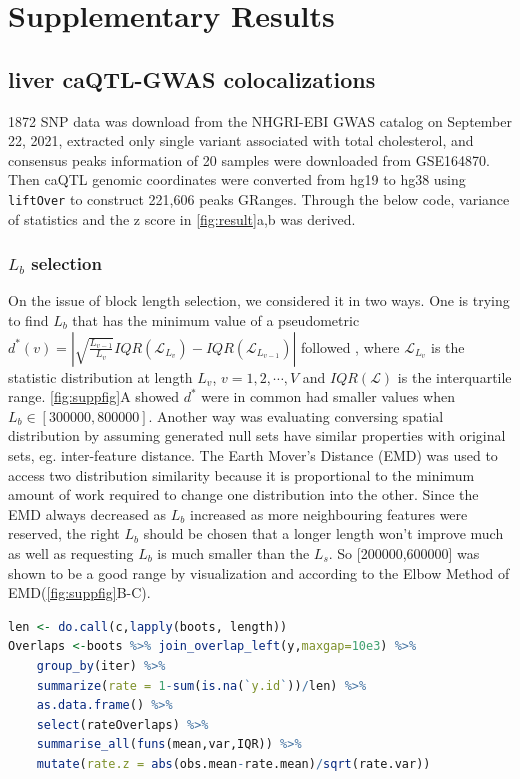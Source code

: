 \documentclass{article}
\newcommand{\code}[1]{\texttt{#1}}
\begin{document}

\section{Supplementary Results} \label{sec:results}
\subsection{liver caQTL-GWAS colocalizations}
1872 SNP data was download from the NHGRI-EBI GWAS catalog \citep{gwascatalog} on September 22, 2021, extracted only single variant  associated with total cholesterol, and consensus peaks information of 20 samples were downloaded from GSE164870.
Then caQTL genomic coordinates were converted from hg19 to hg38 using \code{liftOver} to construct 221,606 peaks GRanges. Through the below code, variance of statistics and the z score in \cref{fig:result}a,b was derived.

\subsubsection{$L_b$ selection}
On the issue of 
block length selection, we considered it in two ways. One is trying to find $L_b$ that has the minimum value of a pseudometric $d^*(v)=|\sqrt{\frac{L_{v-1}}{L_v}}IQR(\mathcal{L}_{L_v})-IQR(\mathcal{L}_{L_{v-1}})|$ followed \citet{bickel2010subsampling}, where $\mathcal{L}_{L_v}$ is the statistic distribution at length $L_v$, $v=1,2,\cdots,V$ and $IQR(\mathcal{L})$ is the interquartile range. \cref{fig:suppfig}A showed $d^*$ were in common had smaller values when $L_b\in[300000,800000]$. Another way was evaluating conversing spatial distribution by assuming generated null sets have similar properties with original sets, eg. inter-feature distance. The Earth Mover's Distance (EMD) was used to access two distribution similarity because it is proportional to the minimum amount of work required to change one distribution into the other. Since the EMD always decreased as $L_b$ increased as more neighbouring features were reserved, the right $L_b$ should be chosen that a longer length won’t improve much as well as requesting $L_b$ is much smaller than the $L_s$. So [200000,600000] was shown to be  a good range by visualization and according to the Elbow Method of EMD(\cref{fig:suppfig}B-C). 

\begin{lstlisting}[language=R]
len <- do.call(c,lapply(boots, length))
Overlaps <-boots %>% join_overlap_left(y,maxgap=10e3) %>%
    group_by(iter) %>%
    summarize(rate = 1-sum(is.na(`y.id`))/len) %>%
    as.data.frame() %>% 
    select(rateOverlaps) %>% 
    summarise_all(funs(mean,var,IQR)) %>% 
    mutate(rate.z = abs(obs.mean-rate.mean)/sqrt(rate.var))

\end{lstlisting} 
\end{document}
